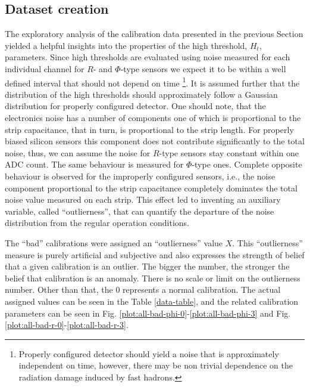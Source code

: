 \subsection{Dataset creation}
The exploratory analysis of the calibration data presented in the previous Section yielded a helpful insights into the properties of the high threshold, $H_t$, parameters.
Since high thresholds are evaluated using noise measured for each individual channel for $R$- and $\Phi$-type sensors we expect it to be within a well defined interval that should not depend on time \footnote{Properly configured detector should yield a noise that is approximately independent on time, however, there may be non trivial dependence on the radiation damage induced by fast hadrons.}.
It is assumed further that the distribution of the high thresholds should approximately follow a Gaussian distribution for properly configured detector. One should note, that the electronics noise has a number of components one of which is proportional to the strip capacitance, that in turn, is proportional to the strip length. For properly biased silicon sensors this component does not contribute significantly to the total noise, thus, we can assume the noise for $R$-type sensors stay constant within one ADC count. The same behaviour is measured for $\Phi$-type ones. Complete opposite behaviour is observed for the improperly configured sensors, i.e., the noise component proportional to the strip capacitance completely dominates the total noise value measured on each strip. This effect led to inventing an auxiliary variable, called ``outlierness'', that can quantify the departure of the noise distribution from the regular operation conditions.

The ``bad'' calibrations were assigned an ``outlierness'' value $X$.
This ``outlierness'' measure is purely artificial and subjective and also expresses the strength of belief that a given calibration is an outlier.
The bigger the number, the stronger the belief that calibration is an anomaly.
There is no scale or limit on the outlierness number. Other than that, the 0 represents a normal calibration.
The actual assigned values can be seen in the Table \ref{data-table}, and the related calibration parameters can be seen in Fig. \ref{plot:all-bad-phi-0}-\ref{plot:all-bad-phi-3} and Fig. \ref{plot:all-bad-r-0}-\ref{plot:all-bad-r-3}.

